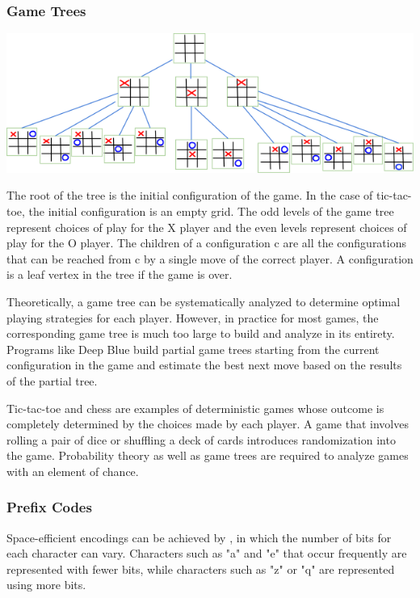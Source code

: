 \subsubsection*{Game Trees}
\begin{center}
  \includegraphics[width=0.7\linewidth]{resources/tictactoe game tree.png}
\end{center}
The root of the tree is the initial configuration of the game. In the case of tic-tac-toe, the initial configuration is an empty grid. The odd levels of the game tree represent choices of play for the X player and the even levels represent choices of play for the O player. The children of a configuration c are all the configurations that can be reached from c by a single move of the correct player. A configuration is a leaf vertex in the tree if the game is over.

Theoretically, a game tree can be systematically analyzed to determine optimal playing strategies for each player. However, in practice for most games, the corresponding game tree is much too large to build and analyze in its entirety. Programs like Deep Blue build partial game trees starting from the current configuration in the game and estimate the best next move based on the results of the partial tree.

Tic-tac-toe and chess are examples of deterministic games whose outcome is completely determined by the choices made by each player. A game that involves rolling a pair of dice or shuffling a deck of cards introduces randomization into the game. Probability theory as well as game trees are required to analyze games with an element of chance.

\subsubsection*{Prefix Codes}
Space-efficient encodings can be achieved by , in which the number of bits for each character can vary. Characters such as "a" and "e" that occur frequently are represented with fewer bits, while characters such as "z" or "q" are represented using more bits.


